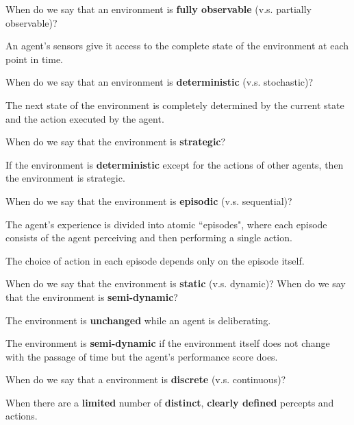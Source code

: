\begin{cstqsn*}
When do we say that an environment is \textbf{fully observable} (v.s. partially
observable)?
\end{cstqsn*}

An agent's sensors give it access to the complete state of the environment at
each point in time.

\begin{cstqsn*}
When do we say that an environment is \textbf{deterministic} (v.s. stochastic)?
\end{cstqsn*}

The next state of the environment is completely determined by the current state
and the action executed by the agent.


\begin{cstqsn*}
When do we say that the environment is \textbf{strategic}?
\end{cstqsn*}

If the environment is \textbf{deterministic} except for the actions of other
agents, then the environment is strategic.

\begin{cstqsn*}
When do we say that the environment is \textbf{episodic} (v.s. sequential)?
\end{cstqsn*}

The agent's experience is divided into atomic ``episodes", where each episode
consists of the agent perceiving and then performing a single action. 

The choice of action in each episode depends only on the episode itself.

\begin{cstqsn*}
When do we say that the environment is \textbf{static} (v.s. dynamic)? When do
we say that the environment is \textbf{semi-dynamic}?
\end{cstqsn*}

The environment is \textbf{unchanged} while an agent is deliberating. 

The environment is \textbf{semi-dynamic} if the environment itself does not
change with the passage of time but the agent's performance score does.

\begin{cstqsn*}
When do we say that a environment is \textbf{discrete} (v.s. continuous)?
\end{cstqsn*}

When there are a \textbf{limited} number of \textbf{distinct}, \textbf{clearly
defined} percepts and actions.

